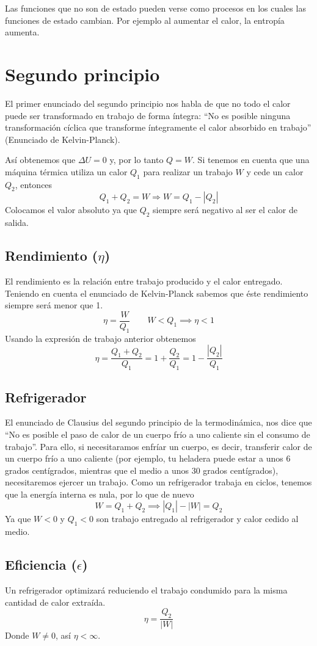 \documentclass{article}
\begin{document}
Las funciones que no son de estado pueden verse como procesos en los cuales las
funciones de estado cambian. Por ejemplo al aumentar el calor, la entropía
aumenta.

\section{Segundo principio}
El primer enunciado del segundo principio nos habla de que no todo el calor
puede ser transformado en trabajo de forma íntegra:
``No es posible ninguna transformación cíclica que transforme íntegramente el
calor absorbido en trabajo'' (Enunciado de Kelvin-Planck).

Así obtenemos que $\Delta U = 0$ y, por lo tanto $Q = W$. Si tenemos en cuenta
que una máquina térmica utiliza un calor $Q_1$ para realizar un trabajo $W$ y
cede un calor $Q_2$, entonces
\begin{equation}
    Q_1 + Q_2 = W \Rightarrow W = Q_1 - |Q_2|
\end{equation}
Colocamos el valor absoluto ya que $Q_2$ siempre será negativo al ser el calor
de salida.

\subsection{Rendimiento ($\eta$)}
El rendimiento es la relación entre trabajo producido y el calor entregado.
Teniendo en cuenta el enunciado de Kelvin-Planck sabemos que éste rendimiento
siempre será menor que 1.
\begin{equation}
    \eta = \frac{W}{Q_1} \qquad W < Q_1 \implies \eta < 1
\end{equation}
Usando la expresión de trabajo anterior obtenemos
\begin{equation}
    \eta = \frac{Q_1 + Q_2}{Q_1} = 1 + \frac{Q_2}{Q_1} = 1 - \frac{|Q_2|}{Q_1}
\end{equation}

\subsection{Refrigerador}
El enunciado de Clausius del segundo principio de la termodinámica, nos dice
que ``No es posible el paso de calor de un cuerpo frío a uno caliente sin el
consumo de trabajo''. Para ello, si necesitaramos enfríar un cuerpo, es decir,
transferir calor de un cuerpo frío a uno caliente (por ejemplo, tu heladera
puede estar a unos 6 grados centígrados, mientras que el medio a unos 30 grados
centígrados), necesitaremos ejercer un trabajo. Como un refrigerador trabaja en
ciclos, tenemos que la energía interna es nula, por lo que de nuevo
\begin{equation}
    W = Q_1 + Q_2 \implies |Q_1| - |W| = Q_2
\end{equation}
Ya que $W < 0$ y $Q_1 < 0$ son trabajo entregado al refrigerador y calor cedido
al medio.

\subsection{Eficiencia ($\epsilon$)}
Un refrigerador optimizará reduciendo el trabajo condumido para la misma
cantidad de calor extraída.
\begin{equation}
    \eta = \frac{Q_2}{|W|}
\end{equation}
Donde $W\ne 0$, así $\eta < \infty$.
\end{document}
